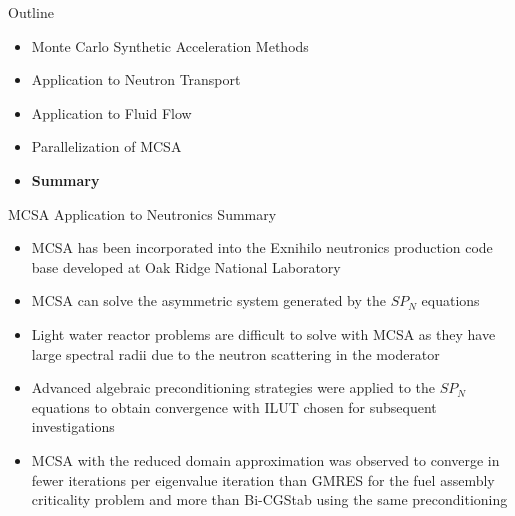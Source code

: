 \documentclass{beamer}
\begin{document}
\begin{frame}{Outline}

  \begin{itemize}
  \item Monte Carlo Synthetic Acceleration Methods
    \bigskip
  \item Application to Neutron Transport
    \bigskip
  \item Application to Fluid Flow
    \bigskip
  \item Parallelization of MCSA
    \bigskip
  \item \textbf{Summary}
  \end{itemize}

\end{frame}

\begin{frame}{MCSA Application to Neutronics Summary}

  \small{
    \begin{itemize}
    \item MCSA has been incorporated into the Exnihilo neutronics
      production code base developed at Oak Ridge National Laboratory
      \medskip
    \item MCSA can solve the asymmetric system generated by the $SP_N$
      equations
      \medskip
    \item Light water reactor problems are difficult to solve with MCSA as
      they have large spectral radii due to the neutron scattering in the
      moderator
      \medskip
    \item Advanced algebraic preconditioning strategies were applied to
      the $SP_N$ equations to obtain convergence with ILUT chosen for
      subsequent investigations
      \medskip
    \item MCSA with the reduced domain approximation was observed to
      converge in fewer iterations per eigenvalue iteration than GMRES
      for the fuel assembly criticality problem and more than
      Bi-CGStab using the same preconditioning
    \end{itemize}
  }

\end{frame}
\end{document}
